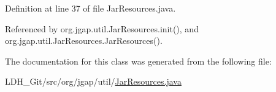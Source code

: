 Definition at line 37 of file Jar\-Resources.\-java.



Referenced by org.\-jgap.\-util.\-Jar\-Resources.\-init(), and org.\-jgap.\-util.\-Jar\-Resources.\-Jar\-Resources().



The documentation for this class was generated from the following file\-:\begin{DoxyCompactItemize}
\item 
L\-D\-H\-\_\-\-Git/src/org/jgap/util/\hyperlink{_jar_resources_8java}{Jar\-Resources.\-java}\end{DoxyCompactItemize}
